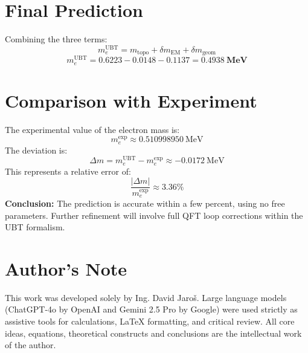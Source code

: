 \documentclass[12pt, a4paper]{article}
\begin{document}
\section{Final Prediction}
Combining the three terms:
\[
m_e^{\text{UBT}} = m_{\text{topo}} + \delta m_{\text{EM}} + \delta m_{\text{geom}} 
\]
\[
m_e^{\text{UBT}} = 0.6223 - 0.0148 - 0.1137 = \mathbf{0.4938~\text{MeV}}
\]

\section{Comparison with Experiment}
The experimental value of the electron mass is:
\[
m_e^{\text{exp}} \approx 0.510998950~\text{MeV}
\]
The deviation is:
\[
\Delta m = m_e^{\text{UBT}} - m_e^{\text{exp}} \approx -0.0172~\text{MeV}
\]
This represents a relative error of:
\[
\frac{|\Delta m|}{m_e^{\text{exp}}} \approx 3.36\%
\]
\textbf{Conclusion:} The prediction is accurate within a few percent, using no free parameters. Further refinement will involve full QFT loop corrections within the UBT formalism.


\section*{Author's Note}

This work was developed solely by Ing. David Jaroš.  
Large language models (ChatGPT-4o by OpenAI and Gemini 2.5 Pro by Google) were used strictly as assistive tools for calculations, LaTeX formatting, and critical review.  
All core ideas, equations, theoretical constructs and conclusions are the intellectual work of the author.
\end{document}
